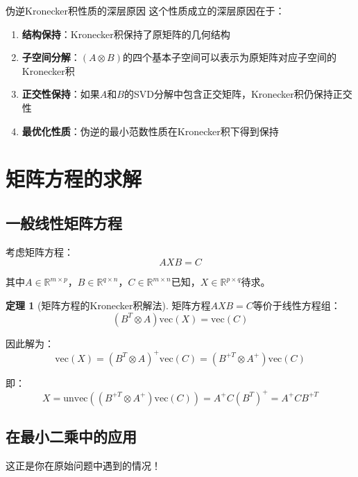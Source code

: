 \documentclass[11pt,a4paper]{ctexart}
\theoremstyle{definition}
\newtheorem{theorem}{定理}[section]
\newcommand{\RR}{\mathbb{R}}
\newcommand{\vect}{\text{vec}}
\newcommand{\unvec}{\text{unvec}}
\begin{document}
\begin{insight}{伪逆Kronecker积性质的深层原因}
这个性质成立的深层原因在于：
\begin{enumerate}
\item \textbf{结构保持}：Kronecker积保持了原矩阵的几何结构
\item \textbf{子空间分解}：$(A \otimes B)$的四个基本子空间可以表示为原矩阵对应子空间的Kronecker积
\item \textbf{正交性保持}：如果$A$和$B$的SVD分解中包含正交矩阵，Kronecker积仍保持正交性
\item \textbf{最优化性质}：伪逆的最小范数性质在Kronecker积下得到保持
\end{enumerate}
\end{insight}

\section{矩阵方程的求解}

\subsection{一般线性矩阵方程}

考虑矩阵方程：
$$AXB = C$$

其中$A \in \RR^{m \times p}$，$B \in \RR^{q \times n}$，$C \in \RR^{m \times n}$已知，$X \in \RR^{p \times q}$待求。

\begin{theorem}[矩阵方程的Kronecker积解法]
矩阵方程$AXB = C$等价于线性方程组：
$$(B^T \otimes A) \vect(X) = \vect(C)$$

因此解为：
$$\vect(X) = (B^T \otimes A)^+ \vect(C) = (B^{+T} \otimes A^+) \vect(C)$$

即：
$$X = \unvec((B^{+T} \otimes A^+) \vect(C)) = A^+ C (B^T)^+ = A^+ C B^{+T}$$
\end{theorem}

\subsection{在最小二乘中的应用}

这正是你在原始问题中遇到的情况！
\end{document}
